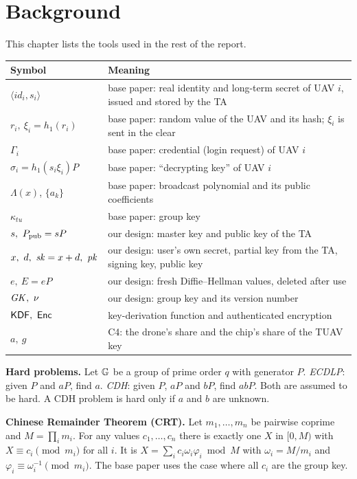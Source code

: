 \documentclass[11pt,openany]{report}
\begin{document}
\chapter{Background}\label{ch:bg}
This chapter lists the tools used in the rest of the report.

\begin{center}
\small
\begin{tabularx}{\linewidth}{@{}l X@{}}
\toprule
\textbf{Symbol} & \textbf{Meaning}\\
\midrule
$\langle id_i,s_i\rangle$ & base paper: real identity and long-term secret of UAV $i$, issued and stored by the TA\\
$r_i,\ \xi_i=h_1(r_i)$ & base paper: random value of the UAV and its hash; $\xi_i$ is sent in the clear\\
$\Gamma_i$ & base paper: credential (login request) of UAV $i$\\
$\sigma_i=h_1(s_i\xi_i)P$ & base paper: ``decrypting key'' of UAV $i$\\
$\Lambda(x)$, $\{a_k\}$ & base paper: broadcast polynomial and its public coefficients\\
$\kappa_{tu}$ & base paper: group key\\
\midrule
$s,\ \Ppub=sP$ & our design: master key and public key of the TA\\
$x,\ d,\ \sk=x+d,\ \pk$ & our design: user's own secret, partial key from the TA, signing key, public key\\
$e,\ E=eP$ & our design: fresh Diffie--Hellman values, deleted after use\\
$\GK,\ \nu$ & our design: group key and its version number\\
$\KDF,\ \Enc$ & key-derivation function and authenticated encryption\\
$a,\ g$ & C4: the drone's share and the chip's share of the TUAV key\\
\bottomrule
\end{tabularx}
\end{center}

\textbf{Hard problems.} Let $\mathbb{G}$ be a group of prime order $q$ with generator $P$. \emph{ECDLP}: given $P$ and $aP$, find $a$. \emph{CDH}: given $P$,
$aP$ and $bP$, find $abP$. Both are assumed to be hard. A CDH problem is hard only if $a$ and $b$ are unknown.

\textbf{Chinese Remainder Theorem (CRT).} Let $m_1,\dots,m_n$ be pairwise coprime and $M=\prod_im_i$. For any values $c_1,\dots,c_n$ there is exactly one
$X$ in $[0,M)$ with $X\equiv c_i\pmod{m_i}$ for all $i$. It is $X=\sum_ic_i\omega_i\varphi_i\bmod M$ with $\omega_i=M/m_i$ and
$\varphi_i\equiv\omega_i^{-1}\pmod{m_i}$. The base paper uses the case where all $c_i$ are the group key.
\end{document}
